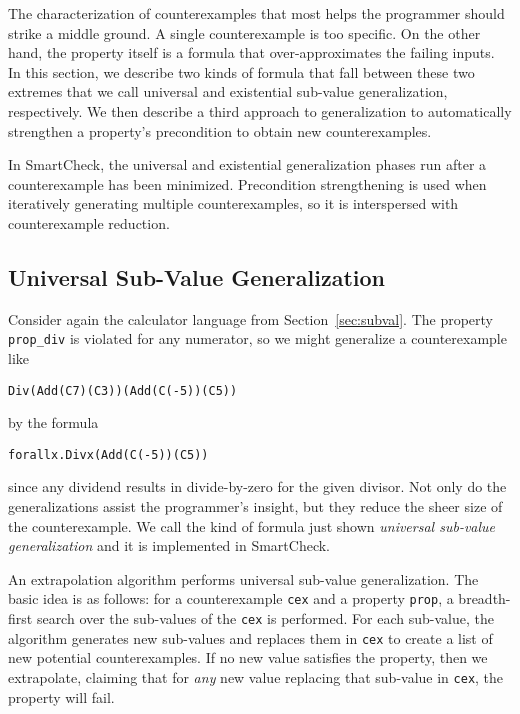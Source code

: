 \documentclass{sigplanconf}
\newenvironment{code}{\begin{alltt}\footnotesize}{\end{alltt}}
\newcommand{\ttp}[1]{\texttt{#1}}
\begin{document}
The characterization of counterexamples that most helps the programmer should
strike a middle ground.  A single counterexample is too specific.  On the other
hand, the property itself is a formula that over-approximates the failing
inputs.  In this section, we describe two kinds of formula that fall between
these two extremes that we call universal and existential sub-value
generalization, respectively.  We then describe a third approach to
generalization to automatically strengthen a property's precondition to obtain
new counterexamples.

In SmartCheck, the universal and existential generalization phases run after a
counterexample has been minimized.  Precondition strengthening is used when
iteratively generating multiple counterexamples, so it is interspersed with
counterexample reduction.

\subsection{Universal Sub-Value Generalization}\label{sec:universal}
Consider again the calculator language from Section~\ref{sec:subval}.  The
property \ttp{prop\_div} is violated for any numerator, so we might generalize a
counterexample like
%
\begin{code}
Div (Add (C 7) (C 3)) (Add (C (-5)) (C 5))
\end{code}
%
\noindent
by the formula
%
\begin{code}
forall x . Div x (Add (C (-5)) (C 5))
\end{code}
%
\noindent
since any dividend results in divide-by-zero for the given divisor.  Not only do
the generalizations assist the programmer's insight, but they reduce the sheer
size of the counterexample.  We call the kind of formula just shown
\emph{universal sub-value generalization} and it is implemented in SmartCheck.

An extrapolation algorithm performs universal sub-value generalization.  The
basic idea is as follows: for a counterexample \ttp{cex} and a property
\ttp{prop}, a breadth-first search over the sub-values of the \ttp{cex} is
performed.  For each sub-value, the algorithm generates new sub-values and
replaces them in \ttp{cex} to create a list of new potential counterexamples.
If no new value satisfies the property, then we extrapolate, claiming that for
\emph{any} new value replacing that sub-value in \ttp{cex}, the property will
fail.
\end{document}
